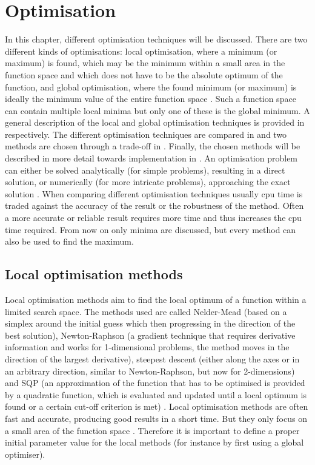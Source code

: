 \chapter{Optimisation} %
\label{ch:optimisation}
In this chapter, different optimisation techniques will be discussed. There are two different kinds of optimisations: local optimisation, where a minimum (or maximum) is found, which may be the minimum within a small area in the function space and which does not have to be the absolute optimum of the function, and global optimisation, where the found minimum (or maximum) is ideally the minimum value of the entire function space \cite{visser2014}. Such a function space can contain multiple local minima but only one of these is the global minimum. A general description of the local and global optimisation techniques is provided in  respectively. The different optimisation techniques are compared in  and two methods are chosen through a trade-off in . Finally, the chosen methods will be described in more detail towards implementation in . An optimisation problem can either be solved analytically (for simple problems), resulting in a direct solution, or numerically (for more intricate problems), approaching the exact solution \cite{noomen2013}. When comparing different optimisation techniques usually cpu time is traded against the accuracy of the result or the robustness of the method. Often a more accurate or reliable result requires more time and thus increases the cpu time required. From now on only minima are discussed, but every method can also be used to find the maximum.


\section{Local optimisation methods}
\label{sec:diffmethloc}
Local optimisation methods aim to find the local optimum of a function within a limited search space. The methods used are called Nelder-Mead (based on a simplex around the initial guess which then progressing in the direction of the best solution), Newton-Raphson (a gradient technique that requires derivative information and works for 1-dimensional problems, the method moves in the direction of the largest derivative), steepest descent (either along the axes or in an arbitrary direction, similar to Newton-Raphson, but now for 2-dimensions) and \ac{SQP} (an approximation of the function that has to be optimised is provided by a quadratic function, which is evaluated and updated until a local optimum is found or a certain cut-off criterion is met) \cite{noomen2013,musegaas2012}. Local optimisation methods are often fast and accurate, producing good results in a short time. But they only focus on a small area of the function space \cite{boyd2004}. Therefore it is important to define a proper initial parameter value for the local methods (for instance by first using a global optimiser). \\

